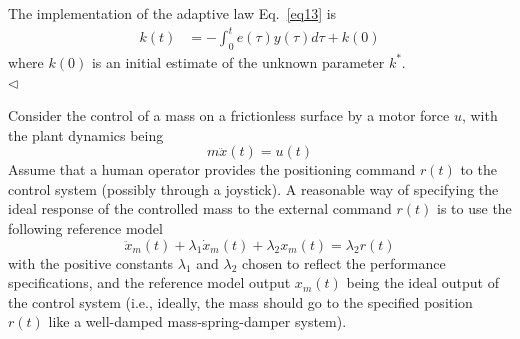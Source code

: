 \documentclass[12pt,a4paper,oneside]{book}
\begin{document}
\begin{onehalfspace}
\begin{example}
	The implementation of the adaptive law Eq.~\ref{eq13} is
	\begin{equation}\label{eq15}
		\begin{aligned}
			k(t) &= -\int_{0}^{t}e(\tau)y(\tau)d\tau+k(0)
		\end{aligned}
	\end{equation} 
	where $k(0)$ is an initial estimate of the unknown parameter $k^*$.\\
	$\triangleleft$
\end{example}
\begin{example}
	Consider the control of a mass on a frictionless surface by a motor force $u$, with the plant dynamics being 
	\begin{equation}\label{slotineli_1}
		m\ddot{x}(t)=u(t)
	\end{equation}  
	Assume that a human operator provides the positioning command $r(t)$ to the control system (possibly through a joystick). A reasonable way of specifying the ideal response of the controlled mass to the external command $r(t)$ is to use the following reference model
	\begin{equation}\label{slotineli_2}
		\ddot{x}_m(t)+\lambda_1\dot{x}_m(t)+\lambda_2x_m(t)=\lambda_2r(t)
	\end{equation}  
	with the positive constants $\lambda_1$ and $\lambda_2$ chosen to reflect the performance specifications, and the reference model output $x_m(t)$ being the ideal output of the control system (i.e., ideally, the mass should go to the specified position $r(t)$ like a well-damped mass-spring-damper system).
	

\end{example}
\end{onehalfspace}
\end{document}
